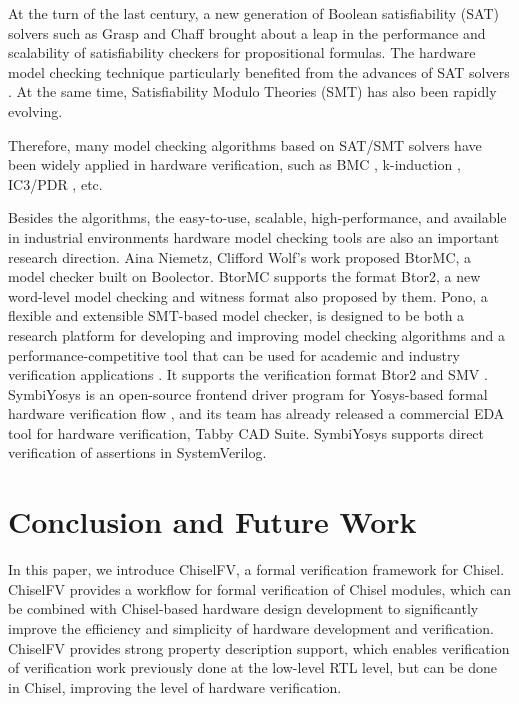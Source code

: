 \documentclass[conference]{IEEEtran}
\theoremstyle{definition}
\begin{document}
At the turn of the last century, a new generation of Boolean satisfiability (SAT) solvers such as Grasp \cite{SilvaS96} and Chaff \cite{MoskewiczMZZM01} brought about a leap in the performance and scalability of satisfiability checkers for propositional formulas. The hardware model checking technique particularly benefited from the advances of SAT solvers \cite{vizel2015boolean}. At the same time, Satisfiability Modulo Theories (SMT) \cite{barrett2018satisfiability} has also been rapidly evolving. 

Therefore, many model checking algorithms based on SAT/SMT solvers have been widely applied in hardware verification, such as BMC \cite{BiereCCZ99}, k-induction \cite{tinelli2012smt}, IC3/PDR \cite{Bradley11}, etc.

Besides the algorithms, the easy-to-use, scalable, high-performance, and available in industrial environments hardware model checking tools are also an important research direction. Aina Niemetz, Clifford Wolf's work \cite{niemetz2018btor2} proposed BtorMC, a model checker built on Boolector. BtorMC supports the format Btor2, a new word-level model checking and witness format also proposed by them. Pono, a flexible and extensible SMT-based model checker, is designed to be both a research platform for developing and improving model checking algorithms and a performance-competitive tool that can be used for academic and industry verification applications \cite{mann2021pono}. It supports the verification format Btor2 and SMV \cite{clarke1996symbolic}. SymbiYosys is an open-source frontend driver program for Yosys-based formal hardware verification flow \cite{SymbiYosys}, and its team has already released a commercial EDA tool for hardware verification, Tabby CAD Suite. SymbiYosys supports direct verification of assertions in SystemVerilog.

\section{Conclusion and Future Work}

In this paper, we introduce ChiselFV, a formal verification framework for Chisel. ChiselFV provides a workflow for formal verification of Chisel modules, which can be combined with Chisel-based hardware design development to significantly improve the efficiency and simplicity of hardware development and verification. ChiselFV provides strong property description support, which enables verification of verification work previously done at the low-level RTL level, but can be done in Chisel, improving the level of hardware verification.
\end{document}
